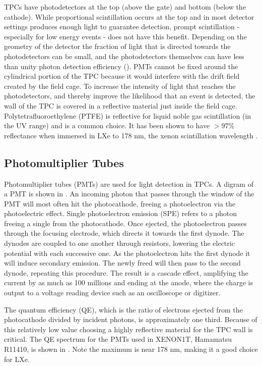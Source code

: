 TPCs have photodetectors at the top (above the gate) and bottom (below the cathode).  While proportional scintillation occurs at the top
and in most detector settings produces enough light to guarantee detection, prompt scintillation - especially for low energy events - does
not have this benefit.  Depending on the geometry of the detector the fraction of light that is directed towards the photodetectors can
be small, and the photodetectors themselves can have less than unity photon detection efficiency ().  PMTs cannot
be fixed around the cylindrical portion of the TPC because it would interfere with the drift field created by the field cage.  To increase
the intensity of light that reaches the photodetectors, and thereby improve the likelihood that an event is
detected, the wall of the TPC is covered in a reflective material just inside the field cage.  Polytetrafluoroethylene (PTFE) is
reflective for liquid noble gas scintillation (in the UV range) and is a common choice.  It has been shown to have $> 97 \%$
reflectance when immersed in LXe to 178 nm, the xenon scintillation wavelength .


\subsection{Photomultiplier Tubes}
\label{subsec:tpcs_pmts}
Photomultiplier tubes (PMTs) are used for light detection in TPCs.  A digram of a PMT is shown in .  An
incoming photon that
passes through the window of the PMT will most often hit the photocathode, freeing a photoelectron via the photoelectric effect.  Single
photoelectron emission (SPE) refers to a photon freeing a single \electron from the photocathode.  Once ejected, the photoelectron passes
through the focusing
electrode, which directs it towards the first dynode.  The dynodes are coupled to one another through resistors, lowering the electric
potential with each successive one.  As the photoelectron hits the first dynode it will induce secondary emission.  The newly freed
\electron will then pass to the
second dynode, repeating this procedure.  The result is a cascade effect, amplifying the current by as much as 100 millions and ending
at the anode, where the charge is output to a voltage reading device such as an oscilloscope or digitizer.

The
quantum efficiency (QE), which is the ratio of electrons ejected from the photocathode divided by incident photons, is approximately
one third.  Because of this relatively low value choosing a highly reflective material for the TPC wall is critical.  The QE spectrum for
the PMTs used in XENON1T, Hamamatsu R11410, is shown in .  Note the maximum is near 178 nm, making it a good
choice for LXe.  

